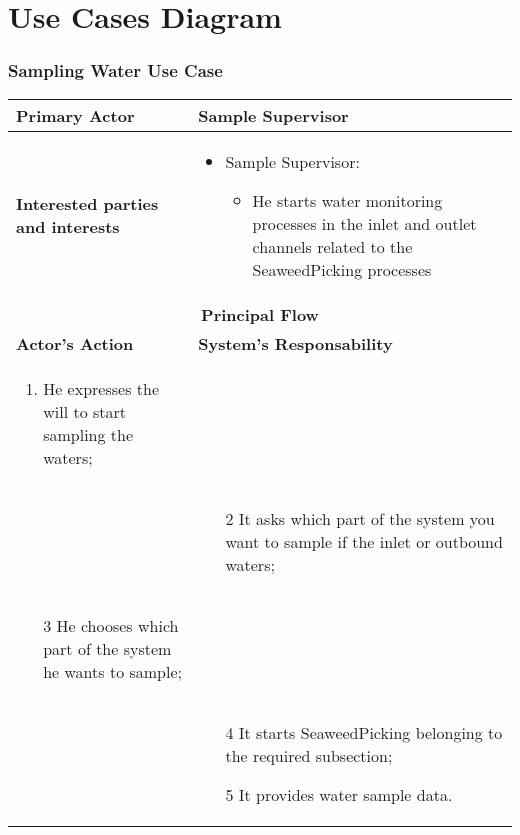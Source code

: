 \chapter{\textbf{Use Cases Diagram}}

\subsection{Sampling Water Use Case}

\begin{longtable}{|p{7cm}|p{7cm}|}

\hline
\textbf{Primary Actor}  & Sample Supervisor\\


\hline
\textbf{Interested parties and interests} &
\begin{itemize}
\item Sample Supervisor:
	\begin{itemize}
 	\item He starts water monitoring processes in the inlet and outlet channels related 	to the SeaweedPicking processes

	\end{itemize}
\end{itemize}
\\


\hline
\multicolumn{2}{|c|}{\textbf{Principal Flow}} \\

\hline
\textbf{Actor's Action} & \textbf{System's Responsability}\\

\hline

\begin{enumerate}
\item He expresses the will to start sampling the waters;
\end{enumerate} &\\

& 
\begin{enumerate}
\item[2]It asks which part of the system you want to sample if the inlet or outbound waters;
\end{enumerate}\\

\begin{enumerate}
\item[3]He chooses which part of the system he wants to sample;			
\end{enumerate} &\\


& 
\begin{enumerate}
\item[4]It starts SeaweedPicking belonging to the required subsection;
\item[5]It provides water sample data.
\end{enumerate}\\

\hline
\end{longtable}

